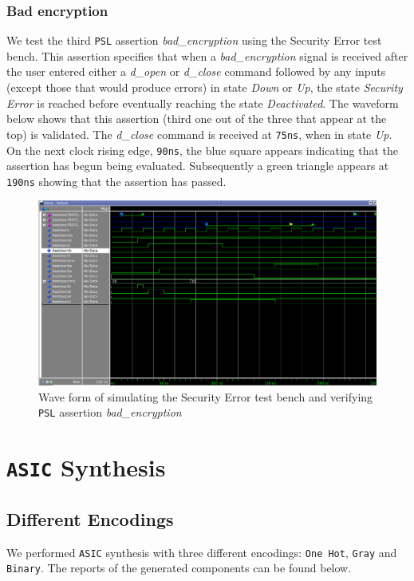 \documentclass[a4paper,11pt]{article}
\begin{document}
    \subsubsection{Bad encryption}
    We test the third \texttt{PSL} assertion \textit{bad\_encryption} using the Security Error test bench. This assertion specifies that when a \textit{bad\_encryption} signal is received after the user entered either a \textit{d\_open} or \textit{d\_close} command followed by any inputs (except those that would produce errors) in state \textit{Down} or \textit{Up}, the state \textit{Security Error} is reached before eventually reaching the state \textit{Deactivated}.  The waveform below shows that this assertion (third one out of the three that appear at the top) is validated. The \textit{d\_close} command is received at \texttt{75ns}, when in state \textit{Up}. On the next clock rising edge, \texttt{90ns}, the blue square appears indicating that the assertion has begun being evaluated. Subsequently a green triangle appears at \texttt{190ns} showing that the assertion has passed.
    
    \begin{figure}[H]
      \centering
      \includegraphics[width=0.9\linewidth]{PSL3_model_testSecurityError.png}  
      \caption{Wave form of simulating the Security Error test bench and verifying \texttt{PSL} assertion \textit{bad\_encryption}}
    \end{figure}
	
	\section{\texttt{ASIC} Synthesis}
	\subsection{Different Encodings}
		
	\par We performed \texttt{ASIC} synthesis with three different encodings: \texttt{One Hot}, \texttt{Gray} and \texttt{Binary}. The reports of the generated components can be found below.
	
\end{document}
